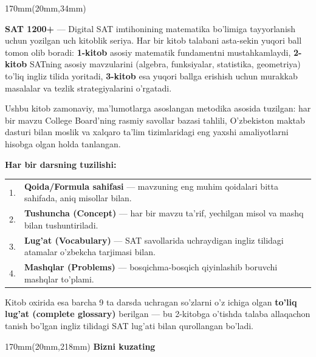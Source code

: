 \documentclass[a4paper]{article}
\begin{document}
\begin{textblock*}{170mm}(20mm,34mm)
{\fontsize{11}{16}\selectfont\color{ink}

\textbf{SAT 1200+} --- Digital SAT imtihonining matematika bo'limiga tayyorlanish uchun yozilgan uch kitoblik seriya. Har bir kitob talabani asta-sekin yuqori ball tomon olib boradi: \textbf{1-kitob} asosiy matematik fundamentni mustahkamlaydi, \textbf{2-kitob} SATning asosiy mavzularini (algebra, funksiyalar, statistika, geometriya) to'liq ingliz tilida yoritadi, \textbf{3-kitob} esa yuqori ballga erishish uchun murakkab masalalar va tezlik strategiyalarini o'rgatadi.

\vspace{4mm}
Ushbu kitob zamonaviy, ma'lumotlarga asoslangan metodika asosida tuzilgan: har bir mavzu College Board'ning rasmiy savollar bazasi tahlili, O'zbekiston maktab dasturi bilan moslik va xalqaro ta'lim tizimlaridagi eng yaxshi amaliyotlarni hisobga olgan holda tanlangan.

\vspace{4mm}
\textbf{Har bir darsning tuzilishi:}

\vspace{2mm}
\begin{tabular}{@{}p{10mm}p{150mm}@{}}
1. & \textbf{Qoida/Formula sahifasi} --- mavzuning eng muhim qoidalari bitta sahifada, aniq misollar bilan. \\[3mm]
2. & \textbf{Tushuncha (Concept)} --- har bir mavzu ta'rif, yechilgan misol va mashq bilan tushuntiriladi. \\[3mm]
3. & \textbf{Lug'at (Vocabulary)} --- SAT savollarida uchraydigan ingliz tilidagi atamalar o'zbekcha tarjimasi bilan. \\[3mm]
4. & \textbf{Mashqlar (Problems)} --- bosqichma-bosqich qiyinlashib boruvchi mashqlar to'plami. \\
\end{tabular}

\vspace{6mm}
Kitob oxirida esa barcha 9 ta darsda uchragan so'zlarni o'z ichiga olgan \textbf{to'liq lug'at (complete glossary)} berilgan --- bu 2-kitobga o'tishda talaba allaqachon tanish bo'lgan ingliz tilidagi SAT lug'ati bilan qurollangan bo'ladi.

}
\end{textblock*}

\begin{textblock*}{170mm}(20mm,218mm)
{\sffamily\bfseries\fontsize{11}{14}\selectfont\color{ink} Bizni kuzating}
\end{textblock*}
\end{document}
